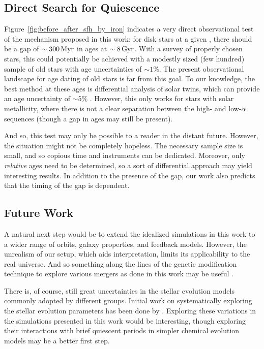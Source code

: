 \subsection{Direct Search for Quiescence}\label{ssec:obsqui}
Figure~\ref{fig:before_after_sfh_by_iron} indicates a very direct observational test of the mechanism proposed in this work: for disk stars at a given \FeH{}, there should be a gap of $\sim300\,\textrm{Myr}$ in ages at $\sim8\,\textrm{Gyr}$. With a survey of properly chosen stars, this could potentially be achieved with a modestly sized (few hundred) sample of old stars with age uncertainties of $\sim1\%$. The present observational landscape for age dating of old stars is far from this goal. To our knowledge, the best method at these ages is differential analysis of solar twins, which can provide an age uncertainty of $\sim5\%$ \citep[e.g.][]{2014ApJ...795...23B,2018MNRAS.474.2580S}. However, this only works for stars with solar metallicity, where there is not a clear separation between the high- and low-$\alpha$ sequences (though a gap in ages may still be present).

And so, this test may only be possible to a reader in the distant future. However, the situation might not be completely hopeless. The necessary sample size is small, and so copious time and instruments can be dedicated. Moreover, only \textit{relative} ages need to be determined, so a sort of differential approach may yield interesting results. In addition to the presence of the gap, our work also predicts that the timing of the gap is \FeH{} dependent.

\subsection{Future Work}
A natural next step would be to extend the idealized simulations in this work to a wider range of orbits, galaxy properties, and feedback models. However, the unrealism of our setup, which aids interpretation, limits its applicability to the real universe. And so something along the lines of the genetic modification technique to explore various mergers as done in this work may be useful \citep{2016MNRAS.455..974R,2017MNRAS.465..547P}.

There is, of course, still great uncertainties in the stellar evolution models commonly adopted by different groups. Initial work on systematically exploring the stellar evolution parameters has been done by \citet{2017A&A...605A..59R,2021MNRAS.508.3365B}. Exploring these variations in the simulations presented in this work would be interesting, though exploring their interactions with brief quiescent periods in simpler chemical evolution models may be a better first step.

